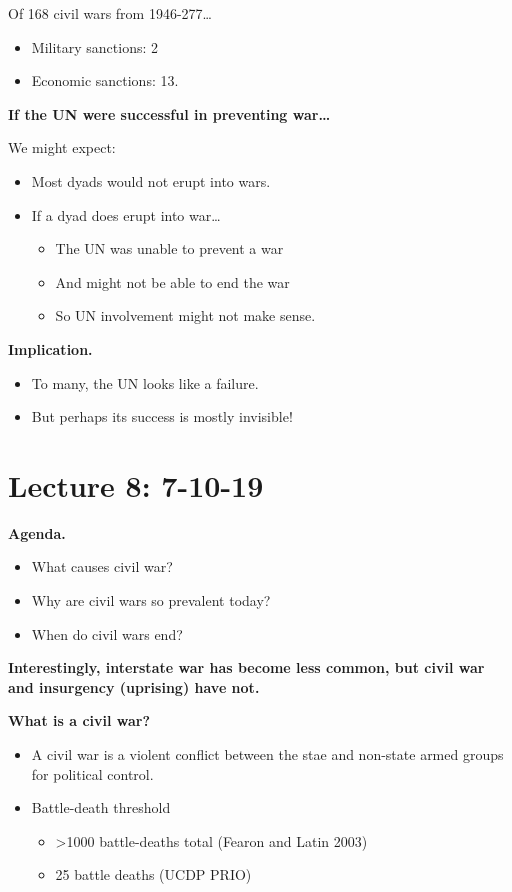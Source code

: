 \documentclass{article}
\begin{document}
Of 168 civil wars from 1946-277\ldots

\begin{itemize}
  \item Military sanctions: 2
  \item Economic sanctions: 13.
\end{itemize}

{\bf If the UN were successful in preventing war\ldots}

We might expect:

\begin{itemize}
  \item Most dyads would not erupt into wars.
  \item If a dyad does erupt into war\ldots
    \begin{itemize}
      \item The UN was unable to prevent a war
      \item And might not be able to end the war
      \item So UN involvement might not make sense.
    \end{itemize}
\end{itemize}

{\bf Implication.}

\begin{itemize}
  \item To many, the UN looks like a failure.
  \item But perhaps its success is mostly invisible!
\end{itemize}

\section{Lecture 8: 7-10-19}

{\bf Agenda.}

\begin{itemize}
  \item What causes civil war?
  \item Why are civil wars so prevalent today?
  \item When do civil wars end?
\end{itemize}

{\bf Interestingly, interstate war has become less common, but civil war and insurgency (uprising) have not.}

{\bf What is a civil war?}

\begin{itemize}
  \item A civil war is a violent conflict between the stae and non-state armed groups for political control.
  \item Battle-death threshold
    \begin{itemize}
      \item >1000 battle-deaths total (Fearon and Latin 2003)
      \item 25 battle deaths (UCDP PRIO)
    \end{itemize}
\end{itemize}
\end{document}
